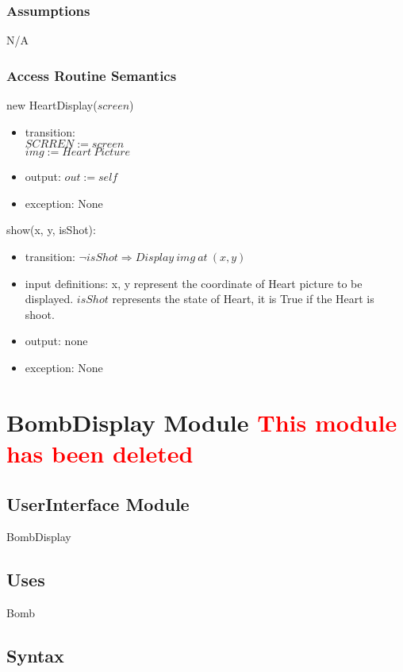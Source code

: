 \documentclass[12pt]{article}
\begin{document}
\subsubsection*{Assumptions}
N/A
\subsubsection*{Access Routine Semantics}

new HeartDisplay($screen$)
\begin{itemize}
    \item transition:\\
    $SCRREN := screen$\\
    $img := Heart\ Picture$
    \item output: $out := self$
    \item exception: None
\end{itemize}

\noindent show(x, y, isShot):
\begin{itemize}
    \item transition: $\lnot isShot \Rightarrow Display\ img\ at\ (x, y)$
    \item input definitions: x, y represent the coordinate of Heart
    picture to be displayed. $isShot$ represents the state of Heart, it is True if the Heart is shoot.
    \item output: none
    \item exception: None
\end{itemize}
\newpage

\section{BombDisplay Module \textcolor{red}{This module has been deleted}}

\subsection*{UserInterface Module}
BombDisplay

\subsection*{Uses}
Bomb

\subsection*{Syntax}
\end{document}
